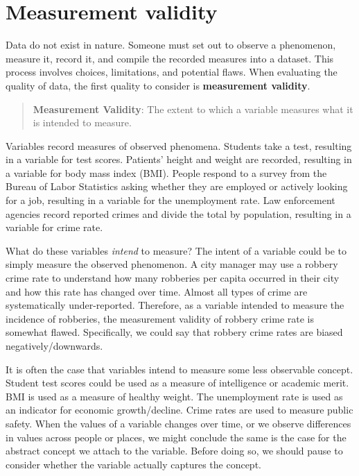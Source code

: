 \documentclass[
]{book}
\begin{document}
\hypertarget{measurement-validity}{%
\section{Measurement validity}\label{measurement-validity}}

Data do not exist in nature. Someone must set out to observe a phenomenon, measure it, record it, and compile the recorded measures into a dataset. This process involves choices, limitations, and potential flaws. When evaluating the quality of data, the first quality to consider is \textbf{measurement validity}.

\begin{quote}
\textbf{Measurement Validity}: The extent to which a variable measures what it is intended to measure.
\end{quote}

Variables record measures of observed phenomena. Students take a test, resulting in a variable for test scores. Patients' height and weight are recorded, resulting in a variable for body mass index (BMI). People respond to a survey from the Bureau of Labor Statistics asking whether they are employed or actively looking for a job, resulting in a variable for the unemployment rate. Law enforcement agencies record reported crimes and divide the total by population, resulting in a variable for crime rate.

What do these variables \emph{intend} to measure? The intent of a variable could be to simply measure the observed phenomenon. A city manager may use a robbery crime rate to understand how many robberies per capita occurred in their city and how this rate has changed over time. Almost all types of crime are systematically under-reported. Therefore, as a variable intended to measure the incidence of robberies, the measurement validity of robbery crime rate is somewhat flawed. Specifically, we could say that robbery crime rates are biased negatively/downwards.

It is often the case that variables intend to measure some less observable concept. Student test scores could be used as a measure of intelligence or academic merit. BMI is used as a measure of healthy weight. The unemployment rate is used as an indicator for economic growth/decline. Crime rates are used to measure public safety. When the values of a variable changes over time, or we observe differences in values across people or places, we might conclude the same is the case for the abstract concept we attach to the variable. Before doing so, we should pause to consider whether the variable actually captures the concept.
\end{document}
